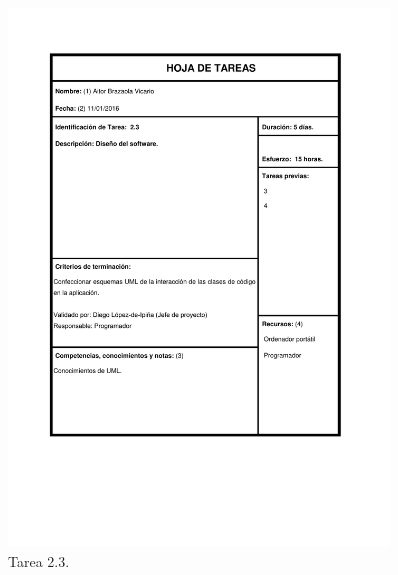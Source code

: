 \documentclass{DeustoFDP}
\begin{document}
\begin{figure}[H]
	\centering
	\includegraphics[width=0.9\textwidth]{fig/Tareas/23}
	\caption{Tarea 2.3.}
	\label{fig:t23}
\end{figure}
\end{document}
